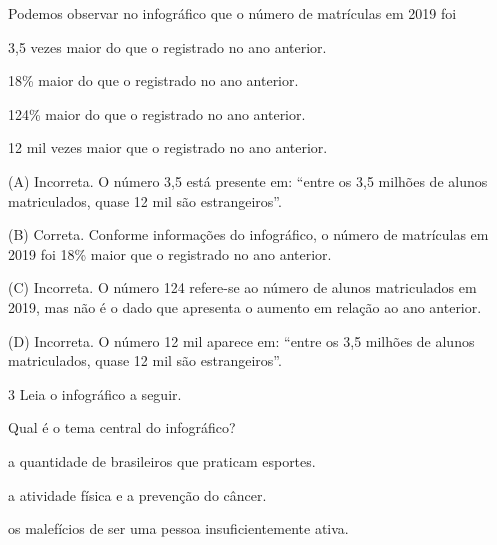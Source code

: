 \begin{escolha}
Podemos observar no infográfico que o número de matrículas em 2019 foi

\begin{escolha}
\item 3,5 vezes maior do que o registrado no ano anterior.

\item 18\% maior do que o registrado no ano anterior.

\item 124\% maior do que o registrado no ano anterior.

\item 12 mil vezes maior que o registrado no ano anterior.
\end{escolha}


(A) Incorreta. O número 3,5 está presente em: ``entre os 3,5 milhões de
alunos matriculados, quase 12 mil são estrangeiros''.

(B) Correta. Conforme informações do infográfico, o número de matrículas
em 2019 foi 18\% maior que o registrado no ano anterior.

(C) Incorreta. O número 124 refere-se ao número de alunos matriculados
em 2019, mas não é o dado que apresenta o aumento em relação ao ano
anterior.

(D) Incorreta. O número 12 mil aparece em: ``entre os 3,5 milhões de
alunos matriculados, quase 12 mil são estrangeiros''.

\num{3} Leia o infográfico a seguir.



Qual é o tema central do infográfico?

\begin{escolha}
\item a quantidade de brasileiros que praticam esportes.

\item a atividade física e a prevenção do câncer.

\item os malefícios de ser uma pessoa insuficientemente ativa.


\end{escolha}
\end{escolha}
